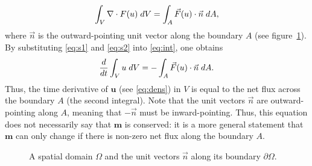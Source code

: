 \documentclass[../main.tex]{subfiles}
\begin{document}
\begin{gather}\label{eq:s2}
	\int_V \nabla\cdot F(u)\hspace*{0.10 cm} dV = \int_A \vec F( u) \cdot \vec n \hspace*{0.10 cm}dA,
\end{gather}
where $\vec n$ is the outward-pointing unit vector along the boundary $A$ (see figure~\ref{fig:domain}). By substituting \ref{eq:s1} and \ref{eq:s2} into \ref{eq:int}, one obtains
\begin{gather}\label{eq:cq}
	\frac{d}{dt} \int_V u \hspace*{0.10 cm} dV =- \int_A \vec F(u) \cdot \vec n \hspace*{0.10 cm}dA.
\end{gather}
Thus, the time derivative of $\mathbf{u}$ (see \ref{eq:dens}) in $V$ is equal to the net flux across the boundary $A$ (the second integral). Note that the unit vectors $\vec n$ are outward-pointing along $A$, meaning that $-\vec n$ must be inward-pointing. Thus, this equation does not necessarily say that $\mathbf{m}$ is conserved: it is a more general statement that $\mathbf{m}$ can only change if there is non-zero net flux along the boundary $A$.
\begin{figure}[h]
	\centering
	\caption{A spatial domain $\Omega$ and the unit vectors $\vec n$ along its boundary $\partial\Omega$.}
	\label{fig:domain}
\end{figure}
\end{document}
